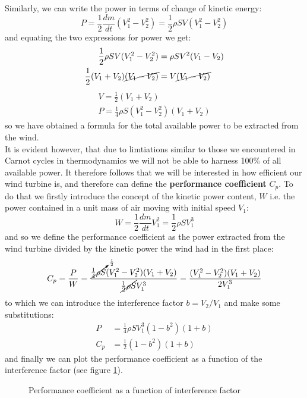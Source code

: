 Similarly, we can write the power in terms of change of kinetic energy:
$$
P = \frac{1}{2} \frac{dm}{dt} (V_1^2 - V_2^2) = \frac{1}{2} \rho SV (V_1^2 - V_2^2)
$$
and equating the two expressions for power we get:
\begin{align*}
    \frac{1}{2} \rho SV (V_1^2 - V_2^2) &= \rho SV^2(V_1 - V_2) \\
    \frac{1}{2} (V_1 + V_2)\cancel{(V_1 - V_2)} &= V \cancel{(V_1 - V_2)}
\end{align*}
\begin{gather*}
    V = \frac{1}{2}(V_1 + V_2)\\
    \boxed{P = \frac{1}{4} \rho S(V_1^2 - V_2^2)(V_1 + V_2)}
\end{gather*}
so we have obtained a formula for the total available power to be extracted from
the wind.\\

It is evident however, that due to limtiations similar to those we encountered
in Carnot cycles in thermodynamics we will not be able to harness 100\% of all
available power. It therefore follows that we will be interested in how efficient
our wind turbine is, and therefore can define the \textbf{performance coefficient}
$C_p$. To do that we firstly introduce the concept of the kinetic power content, 
$W$ i.e. the power contained in a unit mass of air moving with initial speed $V_1$:
$$
W = \frac{1}{2}\frac{dm}{dt} V_1^2 = \frac{1}{2} \rho SV_1^3
$$
and so we define the performance coefficient as the power extracted from the wind
turbine divided by the kinetic power the wind had in the first place:
$$
C_p = \frac{P}{W} = \frac{\cancelto{\frac{1}{2}}{\frac{1}{4}\rho S}(V_1^2 - V_2^2)(V_1 + V_2)}
{\cancel{\frac{1}{2} \rho S}V_1^3} = \frac{(V_1^2 - V_2^2)(V_1 + V_2)}{2V_1^3}
$$
to which we can introduce the interference factor $b=V_2/V_1$ and make some 
substitutions:
\begin{align*}
    P &= \frac{1}{4} \rho S V_1^3 (1 - b^2)(1 + b) \\
    C_p &= \frac{1}{2}(1 - b^2)(1 + b)
\end{align*}
and finally we can plot the performance coefficient as a function of the interference
factor (see figure \ref{fig:performance_coefficient}).
\begin{figure}[h]   
    \centering
    \caption{Performance coefficient as a function of interference factor}
    \label{fig:performance_coefficient}
\end{figure}


